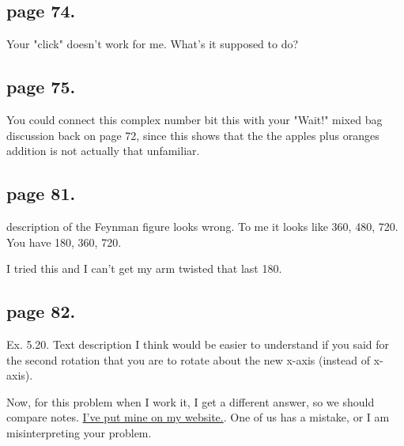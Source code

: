 \documentclass{article}
\begin{document}
\subsection{page 74.}

Your "click" doesn't work for me. What's it supposed to do?

\subsection{page 75. }

You could connect this complex number bit this with your "Wait!" mixed bag discussion back on page 72, since this
shows that the the apples plus oranges addition is not actually that unfamiliar.

\subsection{page 81. }

description of the Feynman figure looks wrong.  To me it looks like 360, 480, 720.  You have 180, 360, 720.

I tried this and I can't get my arm twisted that last 180.

\subsection{page 82. } 

Ex. 5.20.  Text description I think would be easier to understand if you said for the second rotation that you are to
rotate about the new x-axis (instead of x-axis).

Now, for this problem when I work it, I get a different answer, so we should
compare notes.  \href{http://sites.google.com/site/peeterjoot/math2009/two_ninety_rotations.pdf}{I've put mine on my website.}.  One of us has a mistake, or I am misinterpreting your problem.


%
%
\end{document}
